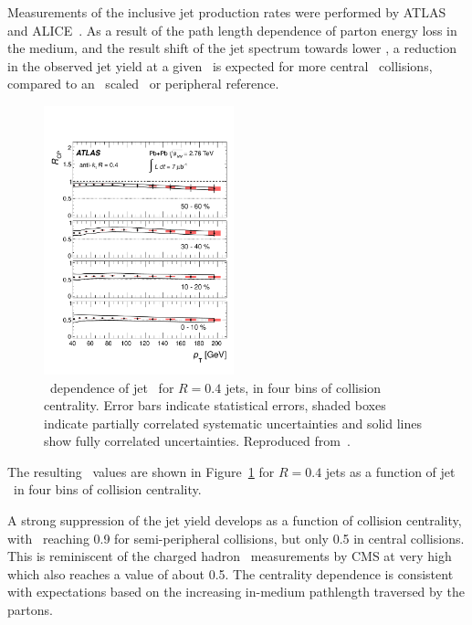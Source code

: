 Measurements of the inclusive jet production rates were performed by ATLAS~\cite{Aad:2012is} and 
ALICE~\cite{Abelev:2013kqa}.
As a result of the path length dependence of parton energy loss in the medium, and 
the result shift of the jet spectrum towards lower \pt,
a reduction in the observed jet yield at a given \pT\ is expected for more 
central \PbPb\ collisions, compared to an \Ncoll\ scaled \pp\ or peripheral reference.

\begin{figure}[!th]
\begin{center}
\includegraphics[width=0.49\textwidth]{jetfigures/ATLAS_jetRCP_04.pdf}
\caption{
\pT\ dependence of jet \Rcp\ for  $R=0.4$ jets,
in four bins of collision centrality. Error bars indicate
statistical errors,  shaded boxes indicate partially 
correlated systematic uncertainties and
solid lines show fully correlated uncertainties. Reproduced from~\cite{Aad:2012is}.}
\label{fig:GR:rcprfour}
\end{center}
\end{figure}
The resulting \Rcp\ values are shown in Figure~\ref{fig:GR:rcprfour}
for $R=0.4$ jets as a function of jet \pT\ in four bins of collision centrality.

A strong suppression of the jet yield develops as a function
of collision centrality, with \Rcp\ reaching 0.9 for semi-peripheral
collisions, but only 0.5 in central collisions.  This is reminiscent
of the charged hadron \Raa\ measurements by CMS at very high \pT\, which 
also reaches a value of about 0.5.
The centrality dependence is consistent with expectations based on the increasing 
in-medium pathlength traversed by the partons. 

